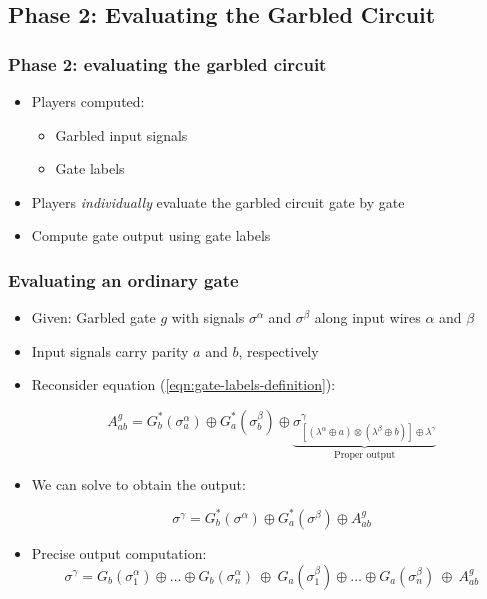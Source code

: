 \documentclass{beamer}
\begin{document}
\subsection{Phase 2: Evaluating the Garbled Circuit}
\label{sec:phase-2-evaluation}

\begin{frame}
  \frametitle{Phase 2: evaluating the garbled circuit}
  \begin{itemize}
  \item Players computed:
    \begin{itemize}
    \item Garbled input signals
    \item Gate labels
    \end{itemize}
  \item Players \emph{individually} evaluate the garbled circuit gate by gate
  \item Compute gate output using gate labels
  \end{itemize}
\end{frame}

\begin{frame}
  \frametitle{Evaluating an ordinary gate}
  \begin{itemize}
  \item Given: Garbled gate $g$ with signals $\sigma^\alpha$ and $\sigma^\beta$ along input wires $\alpha$ and $\beta$
  \item Input signals carry parity $a$ and $b$, respectively
  \item Reconsider equation (\ref{eqn:gate-labels-definition}): 

    \begin{equation*}
      A^g_{ab} = G_b^*(\sigma^\alpha_a) \oplus G_a^*(\sigma^\beta_b) \oplus \underbrace{\sigma_{[(\lambda^\alpha\oplus a)\otimes(\lambda^\beta\oplus b)]\oplus\lambda^\gamma}^\gamma}_{\text{Proper output}}
    \end{equation*}
  \item We can solve to obtain the output:

    \begin{equation*}
      \sigma^\gamma = G_b^*(\sigma^\alpha) \oplus G_a^*(\sigma^\beta) \oplus A_{ab}^g
    \end{equation*}
  \item Precise output computation:
    \begin{equation*}
      \sigma^\gamma=G_b(\sigma_1^{\alpha})\oplus\dots\oplus G_b(\sigma_n^{\alpha})
      \ \oplus \
      G_a(\sigma_1^{\beta})\oplus\dots\oplus G_a(\sigma_n^{\beta})
      \ \oplus\ 
      A_{ab}^g
    \end{equation*}

  \end{itemize}
\end{frame}
\end{document}
